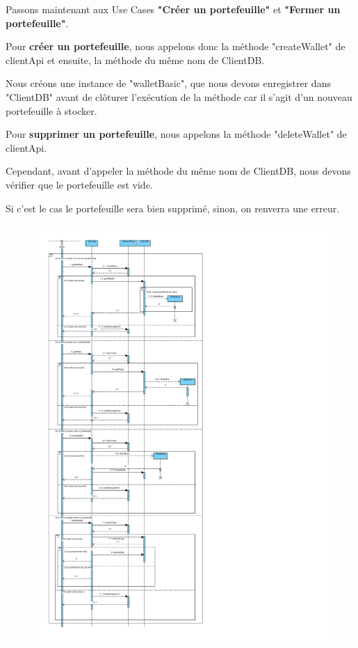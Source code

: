 \begin{flushleft}
Passons maintenant aux Use Cases \textbf{"Créer un portefeuille"} et \textbf{"Fermer un portefeuille"}.
\end{flushleft}

\begin{flushleft}
Pour \textbf{créer un portefeuille}, nous appelons donc la méthode "createWallet" de clientApi et ensuite, la méthode du même nom de ClientDB.
\end{flushleft}

\begin{flushleft}
Nous créons une instance de "walletBasic", que nous devons enregistrer dans "ClientDB" avant de clôturer l'exécution de la méthode car il s'agit d'un nouveau portefeuille à stocker.
\end{flushleft}

\begin{flushleft}
Pour \textbf{supprimer un portefeuille}, nous appelons la méthode "deleteWallet" de clientApi.
\end{flushleft}
\begin{flushleft}
Cependant, avant d'appeler la méthode du même nom de ClientDB, nous devons vérifier que le portefeuille est vide.
\end{flushleft}
\begin{flushleft}
Si c'est le cas le portefeuille sera bien supprimé, sinon, on renverra une erreur.
\end{flushleft}

\newpage
\begin{figure}[h]
\centering
\includegraphics[height = 1.2\textwidth]{Base/sequence/img/client/seqPortefeuilles.pdf}
\end{figure}
\newpage


